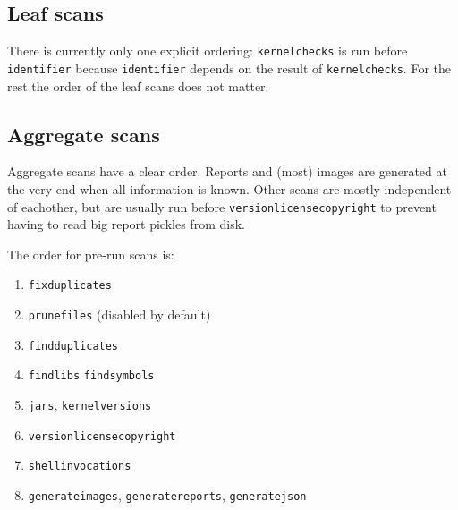 \documentclass[10pt,a4paper]{article}
\begin{document}
\subsection{Leaf scans}

There is currently only one explicit ordering: \texttt{kernelchecks} is run
before \texttt{identifier} because \texttt{identifier} depends on the result
of \texttt{kernelchecks}. For the rest the order of the leaf scans does not
matter.

\subsection{Aggregate scans}

Aggregate scans have a clear order. Reports and (most) images are generated at
the very end when all information is known. Other scans are mostly independent
of eachother, but are usually run before \texttt{versionlicensecopyright} to
prevent having to read big report pickles from disk.

The order for pre-run scans is:

\begin{enumerate}
\item \texttt{fixduplicates}
\item \texttt{prunefiles} (disabled by default)
\item \texttt{findduplicates}
\item \texttt{findlibs} \texttt{findsymbols}
\item \texttt{jars}, \texttt{kernelversions}
\item \texttt{versionlicensecopyright}
\item \texttt{shellinvocations}
\item \texttt{generateimages}, \texttt{generatereports}, \texttt{generatejson}
\end{enumerate}
\end{document}
